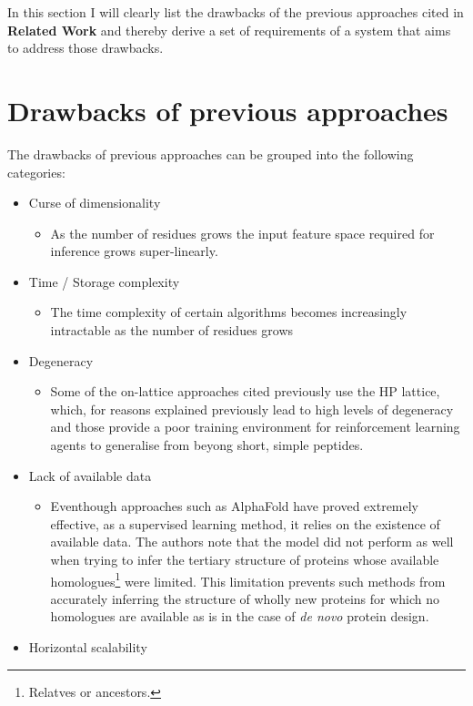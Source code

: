 In this section I will clearly list the drawbacks of the previous approaches cited in \textbf{Related Work}
and thereby derive a set of requirements of a system that aims to address those drawbacks.
\section{Drawbacks of previous approaches}
The drawbacks of previous approaches can be grouped into the following categories:
\begin{itemize}
    \item Curse of dimensionality
    \begin{itemize}
        \item As the number of residues grows the input feature space required for
        inference grows super-linearly.
    \end{itemize}
    \item Time / Storage complexity
    \begin{itemize}
        \item The time complexity of certain algorithms becomes increasingly intractable as
        the number of residues grows
    \end{itemize}
    \item Degeneracy
    \begin{itemize}
        \item Some of the on-lattice approaches cited previously use the HP lattice, which, for reasons
        explained previously lead to high levels of degeneracy and those provide a poor training environment
        for reinforcement learning agents to generalise from beyong short, simple peptides.
    \end{itemize}
    \item Lack of available data
    \begin{itemize}
        \item Eventhough approaches such as AlphaFold have proved extremely effective, as a supervised
        learning method, it relies on the existence of available data. The authors note that the model
        did not perform as well when trying to infer the tertiary structure of proteins whose available 
        homologues\footnote{Relatves or ancestors.} were limited. This limitation prevents such methods
        from accurately inferring the structure of wholly new proteins for which no homologues are available
        as is in the case of \emph{de novo} protein design.
    \end{itemize}
    \item Horizontal scalability

\end{itemize}
